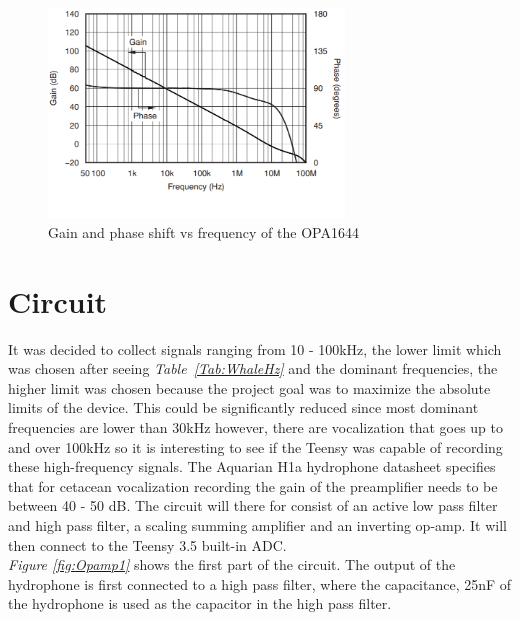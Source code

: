 \begin{figure}[h]
    \centering
    \includegraphics[width=0.7\textwidth]{graphics/dbVsfreq.png}
    \caption{Gain and phase shift vs frequency of the OPA1644\cite{noauthor_opa164x_nodate}}
    \label{fig:dbvsFreq}
\end{figure}


\vspace{4cm}


\section{Circuit}\label{sec:CircResult}

It was decided to collect signals ranging from 10 - 100kHz, the lower limit which was chosen after seeing \textit{Table~\ref{Tab:WhaleHz}} and the dominant frequencies, the higher limit was chosen because the project goal was to maximize the absolute limits of the device.
This could be significantly reduced since most dominant frequencies are lower than 30kHz however, there are vocalization that goes up to and over 100kHz so it is interesting to see if the Teensy was capable of recording these high-frequency signals.
The Aquarian H1a hydrophone datasheet specifies that for cetacean vocalization recording the gain of the preamplifier needs to be between 40 - 50 dB\cite{noauthor_aquarian_nodate}.
The circuit will there for consist of an active low pass filter and high pass filter, a scaling summing amplifier and an inverting op-amp.
It will then connect to the Teensy 3.5 built-in ADC.\\
\indent \textit{Figure \ref{fig:Opamp1}} shows the first part of the circuit.
The output of the hydrophone is first connected to a high pass filter, where the capacitance, 25nF of the hydrophone is used as the capacitor in the high pass filter.

